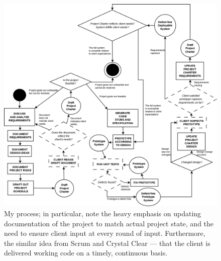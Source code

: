 \begin{figure}
	\centering
	\includegraphics[scale=0.3]{media/MyProcess}
	\caption{My process; in particular, note the heavy emphasis on updating documentation of the
		project to match actual project state, and the need to ensure client input at every round of
			input. Furthermore, the similar idea from Scrum and Crystal Clear --- that the client is
			delivered working code on a timely, continuous basis.}
	\label{MyProcess}
\end{figure}
